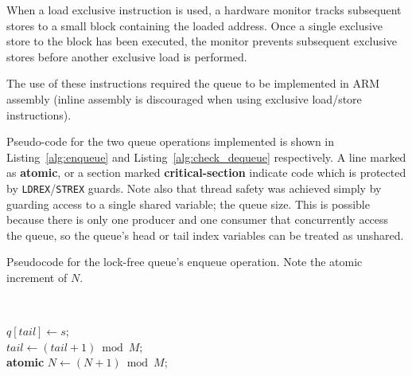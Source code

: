 \documentclass[11pt,a4paper,twocolumn]{scrartcl}
\begin{document}
When a load exclusive instruction is used, a hardware monitor tracks subsequent stores to a small block containing the loaded address. Once a single exclusive store to the block has been executed, the monitor prevents subsequent exclusive stores before another exclusive load is performed.\cite{armv7_m_architecture_manual}

The use of these instructions required the queue to be implemented in ARM assembly (inline assembly is discouraged when using exclusive load/store instructions\cite{compiler_migration_guide}).

Pseudo-code for the two queue operations implemented is shown in Listing~\ref{alg:enqueue} and Listing~\ref{alg:check_dequeue} respectively. A line marked as \textbf{atomic}, or a section marked \textbf{critical-section} indicate code which is protected by \verb!LDREX!/\verb!STREX! guards. Note also that thread safety was achieved simply by guarding access to a single shared variable; the queue size. This is possible because there is only one producer and one consumer that concurrently access the queue, so the queue's head or tail index variables can be treated as unshared.

\begin{algorithm}
   \caption{Pseudocode for the lock-free queue's enqueue operation. Note the atomic increment of $N$.}~\label{alg:enqueue}

      $q[tail] \gets s$; \\
      $tail \gets (tail + 1) \bmod M$;\\
      \textbf{atomic} $N \gets (N + 1) \bmod M$;
\end{algorithm}
\end{document}

